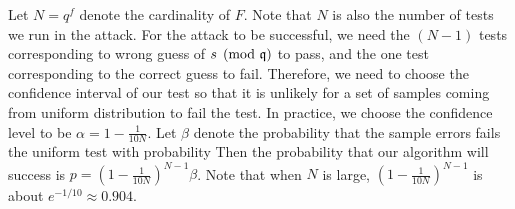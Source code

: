 \documentclass{amsart}
\begin{document}
Let $N = q^f$ denote the cardinality of $F$. Note that $N$ is also the number of tests we run in the attack. For the attack to be successful, we need the $(N-1)$ tests corresponding to wrong guess of $s \pmod{\mathfrak{q}}$ to pass, and the one test corresponding to the correct guess to fail. Therefore, we need to choose the confidence interval of our test so that it is unlikely for a set of samples coming from uniform distribution to fail the test. In practice, we choose the confidence level to be  $\alpha = 1 - \frac{1}{10N}$. Let $\beta$ denote the probability that the sample errors fails the uniform test with probability  Then the probability that our algorithm will success is $p  = (1- \frac{1}{10N})^{N-1} \beta$. Note that when $N$ is large, $(1- \frac{1}{10N})^{N-1}$ is about $e^{-1/10} \approx 0.904$.


\end{document}
